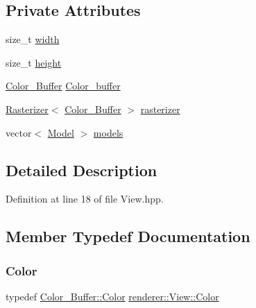 \subsection*{Private Attributes}
\begin{DoxyCompactItemize}
\item 
size\+\_\+t \mbox{\hyperlink{classrenderer_1_1_view_a5632e677221be9cb1120c432acb40893}{width}}
\item 
size\+\_\+t \mbox{\hyperlink{classrenderer_1_1_view_a7fa20c6d863431bb46aed44686231b4b}{height}}
\item 
\mbox{\hyperlink{classrenderer_1_1_view_a21ded0a0afb4aea559b74d004cee798f}{Color\+\_\+\+Buffer}} \mbox{\hyperlink{classrenderer_1_1_view_a329c014c9553fe1d42e95a1a6dc99d58}{Color\+\_\+buffer}}
\item 
\mbox{\hyperlink{classrenderer_1_1_rasterizer}{Rasterizer}}$<$ \mbox{\hyperlink{classrenderer_1_1_view_a21ded0a0afb4aea559b74d004cee798f}{Color\+\_\+\+Buffer}} $>$ \mbox{\hyperlink{classrenderer_1_1_view_a77c9d19b0b18eafd4a4528c1d0115b7d}{rasterizer}}
\item 
vector$<$ \mbox{\hyperlink{classrenderer_1_1_model}{Model}} $>$ \mbox{\hyperlink{classrenderer_1_1_view_aa997e17a7f47acd5ead168a146233e4d}{models}}
\end{DoxyCompactItemize}


\subsection{Detailed Description}


Definition at line 18 of file View.\+hpp.



\subsection{Member Typedef Documentation}
\mbox{\label{classrenderer_1_1_view_a428e8cb10cb82eb1abf59719eb5ba830}} 
\subsubsection{\texorpdfstring{Color}{Color}}
{\footnotesize\ttfamily typedef \mbox{\hyperlink{structrenderer_1_1_color___buffer___rgba8888_1_1_color}{Color\+\_\+\+Buffer\+::\+Color}} \mbox{\hyperlink{classrenderer_1_1_view_a428e8cb10cb82eb1abf59719eb5ba830}{renderer\+::\+View\+::\+Color}}\hspace{0.3cm}{\ttfamily [private]}}



